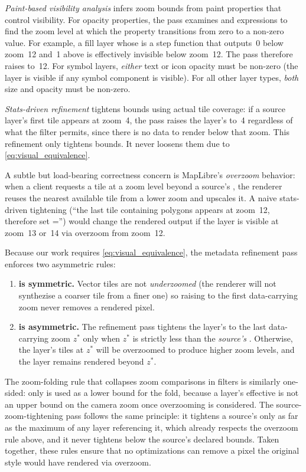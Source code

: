 \emph{Paint-based visibility analysis} infers zoom bounds from paint properties that control visibility.
For opacity properties, the pass examines  and  expressions to find the zoom level at which the property transitions from zero to a non-zero value.
For example, a fill layer whose  is a step function that outputs~0 below zoom~12 and~1 above is effectively invisible below zoom~12.
The pass therefore raises  to~12.
For symbol layers, \emph{either} text or icon opacity must be non-zero (the layer is visible if any symbol component is visible).
For all other layer types, \emph{both} size and opacity must be non-zero.

\emph{Stats-driven refinement} tightens bounds using actual tile coverage: if a source layer's first tile appears at zoom~4, the pass raises the layer's  to~4 regardless of what the filter permits, since there is no data to render below that zoom.
This refinement only tightens bounds.
It never loosens them due to \cref{eq:visual_equivalence}.

A subtle but load-bearing correctness concern is MapLibre's \emph{overzoom} behavior: when a client requests a tile at a zoom level beyond a source's , the renderer reuses the nearest available tile from a lower zoom and upscales it.
A naive stats-driven tightening (\enquote{the last tile containing polygons appears at zoom~12, therefore set =}) would change the rendered output if the layer is visible at zoom~13 or~14 via overzoom from zoom~12.

Because our work requires  \cref{eq:visual_equivalence}, the metadata refinement pass enforces two asymmetric rules:
\begin{enumerate}
    \item \textbf{ is symmetric.}
    Vector tiles are not \emph{underzoomed} (the renderer will not synthezise a coarser tile from a finer one) so raising  to the first data-carrying zoom never removes a rendered pixel.
    \item \textbf{ is asymmetric.}
    The refinement pass tightens the layer's  to the last data-carrying zoom $z^{*}$ only when $z^{*}$ is strictly less than the \emph{source's} .
Otherwise, the layer's tiles at $z^{*}$ will be overzoomed to produce higher zoom levels, and the layer remains rendered beyond $z^{*}$.
\end{enumerate}
The zoom-folding rule that collapses zoom comparisons in filters is similarly one-sided: only  is used as a lower bound for the fold, because a layer's effective  is not an upper bound on the camera zoom once overzooming is considered.
The source-zoom-tightening pass follows the same principle: it tightens a source's  only as far as the maximum  of any layer referencing it, which already respects the overzoom rule above, and it never tightens below the source's declared bounds.
Taken together, these rules ensure that no optimizations can remove a pixel the original style would have rendered via overzoom.

